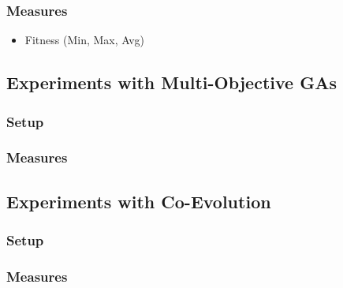 \subsubsection{Measures}
\begin{itemize}
    \item Fitness (Min, Max, Avg)
\end{itemize}

\subsection{Experiments with Multi-Objective GAs}
\subsubsection{Setup}
\subsubsection{Measures}

\subsection{Experiments with Co-Evolution}
\subsubsection{Setup}
\subsubsection{Measures}

\iffalse
\subsection{Experiments with Human Interaction}
\subsubsection{Setup}
\begin{itemize}
    \item Number of turns
    \item Random Start-population
    \item Fixed Start-population
\end{itemize}
\subsubsection{Measures}
\begin{itemize}
    \item Fitness (Min, Max, Avg)
    \item Time complexity
    \item Space complexity
\end{itemize}
\fi
